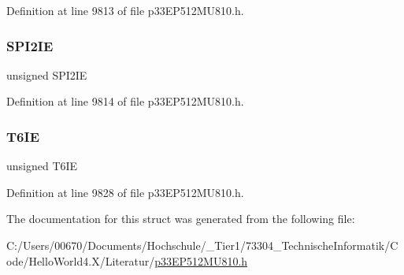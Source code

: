 Definition at line 9813 of file p33\+E\+P512\+M\+U810.\+h.

\mbox{\label{structtag_i_e_c2_b_i_t_s_a4fec31f2c4a1d9be3cc954ffe06a4ca5}} 
\subsubsection{\texorpdfstring{S\+P\+I2\+IE}{SPI2IE}}
{\footnotesize\ttfamily unsigned S\+P\+I2\+IE}



Definition at line 9814 of file p33\+E\+P512\+M\+U810.\+h.

\mbox{\label{structtag_i_e_c2_b_i_t_s_ae9ee13ed51260793c36b82de6a938eb1}} 
\subsubsection{\texorpdfstring{T6\+IE}{T6IE}}
{\footnotesize\ttfamily unsigned T6\+IE}



Definition at line 9828 of file p33\+E\+P512\+M\+U810.\+h.



The documentation for this struct was generated from the following file\+:\begin{DoxyCompactItemize}
\item 
C\+:/\+Users/00670/\+Documents/\+Hochschule/\+\_\+\+Tier1/73304\+\_\+\+Technische\+Informatik/\+Code/\+Hello\+World4.\+X/\+Literatur/\hyperlink{p33_e_p512_m_u810_8h}{p33\+E\+P512\+M\+U810.\+h}\end{DoxyCompactItemize}
